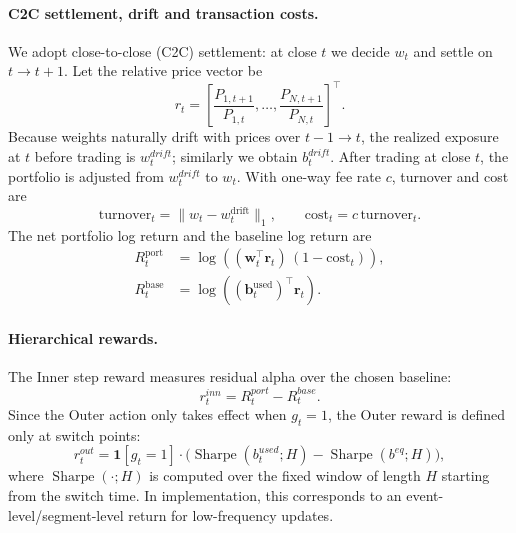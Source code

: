 \documentclass[letterpaper]{article} %
\begin{document}
\paragraph{C2C settlement, drift and transaction costs.}
We adopt close-to-close (C2C) settlement: at close $t$ we decide $w_t$ and settle on $t\to t+1$.
Let the relative price vector be
\begin{equation}
r_t=\left[\frac{P_{1,t+1}}{P_{1,t}},\dots,\frac{P_{N,t+1}}{P_{N,t}}\right]^\top .
\end{equation}
Because weights naturally drift with prices over $t-1\to t$, the realized exposure at $t$ before trading is
$w_t^{drift}$; similarly we obtain $b_t^{drift}$.
After trading at close $t$, the portfolio is adjusted from $w_t^{drift}$ to $w_t$.
With one-way fee rate $c$, turnover and cost are
\begin{equation}
\text{turnover}_t = \lVert w_t - w_t^{\text{drift}} \rVert_1, \qquad \text{cost}_t = c \, \text{turnover}_t.
\end{equation}
The net portfolio log return and the baseline log return are
\begin{equation}
\begin{aligned}
R_t^{\mathrm{port}}
&= \log\!\left(
(\mathbf{w}_t^\top \mathbf{r}_t)\,
(1-\mathrm{cost}_t)
\right),\\
R_t^{\mathrm{base}}
&= \log\!\left(
(\mathbf{b}_t^{\mathrm{used}})^\top \mathbf{r}_t
\right).
\end{aligned}
\end{equation}

\paragraph{Hierarchical rewards.}
The Inner step reward measures residual alpha over the chosen baseline:
\begin{equation}
r_t^{inn}=R_t^{port}-R_t^{base}.
\end{equation}
Since the Outer action only takes effect when $g_t=1$, the Outer reward is defined only at switch points:
\begin{equation}
r_t^{out}=\mathbf{1}[g_t=1]\cdot\Big(\operatorname{Sharpe}(b_t^{used};H)-\operatorname{Sharpe}(b^{eq};H)\Big),
\end{equation}
where $\operatorname{Sharpe}(\cdot;H)$ is computed over the fixed window of length $H$ starting from the switch time.
In implementation, this corresponds to an event-level/segment-level return for low-frequency updates.
\end{document}
